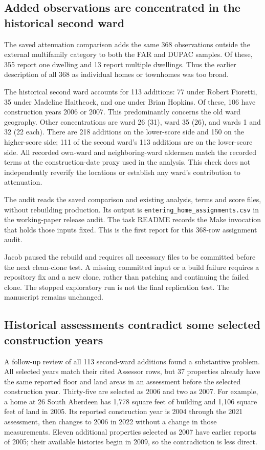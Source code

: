 \subsection*{Added observations are concentrated in the historical second ward}
The saved attenuation comparison adds the same 368 observations outside the
external multifamily category to both the FAR and DUPAC samples. Of these, 355
report one dwelling and 13 report multiple dwellings. Thus the earlier description
of all 368 as individual homes or townhomes was too broad.

The historical second ward accounts for 113 additions: 77 under Robert Fioretti,
35 under Madeline Haithcock, and one under Brian Hopkins. Of these, 106 have
construction years 2006 or 2007. This predominantly concerns the old ward geography.
Other concentrations are ward 26 (31), ward 35 (26), and wards 1 and 32 (22 each).
There are 218 additions on the lower-score side and 150 on the higher-score side;
111 of the second ward's 113 additions are on the lower-score side.
All recorded own-ward and neighboring-ward aldermen match the recorded terms at
the construction-date proxy used in the analysis. This check does not independently
reverify the locations or establish any ward's contribution to attenuation.

The audit reads the saved comparison and existing analysis, terms and score
files, without rebuilding production. Its output is
\texttt{entering\_home\_assignments.csv} in the working-paper release audit.
The task README records the Make invocation that holds those inputs fixed.
This is the first report for this 368-row assignment audit.

Jacob paused the rebuild and requires all necessary files to be committed before
the next clean-clone test. A missing committed input or a build failure requires
a repository fix and a new clone, rather than patching and continuing the failed
clone. The stopped exploratory run is not the final replication test. The
manuscript remains unchanged.

\subsection*{Historical assessments contradict some selected construction years}
A follow-up review of all 113 second-ward additions found a substantive problem.
All selected years match their cited Assessor rows, but 37 properties already
have the same reported floor and land areas in an assessment before the selected
construction year. Thirty-five are selected as 2006 and two as 2007. For example,
a home at 26 South Aberdeen has 1,778 square feet of building and 1,106 square feet
of land in 2005. Its reported construction year is 2004 through the 2021
assessment, then changes to 2006 in 2022 without a change in those measurements.
Eleven additional properties selected as 2007 have earlier reports of 2005;
their available histories begin in 2009, so the contradiction is less direct.

